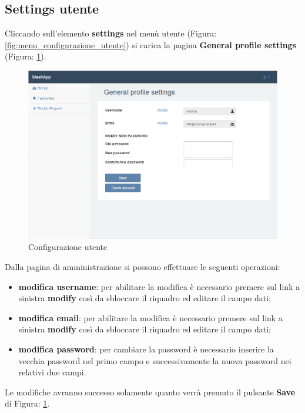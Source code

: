 	\subsection{Settings utente} %
	\label{sec:settings_utente}
		Cliccando sull'elemento \textbf{settings} nel menù utente (Figura: \ref{fig:menu_configurazione_utente}) si carica la pagina \textbf{General profile settings} (Figura: \ref{fig:configurazione_utente}).
		\begin{figure}[H]
			\centering
			\centerline{\includegraphics[width=14cm]{images/configurazione_utente.png}}
			\caption{Configurazione utente}
			\label{fig:configurazione_utente}
		\end{figure}
		Dalla pagina di amministrazione si possono effettuare le seguenti operazioni:
		\begin{itemize}
			\item \textbf{modifica username}: per abilitare la modifica è necessario premere sul link a sinistra \textbf{modify} così da sbloccare il riquadro ed editare il campo dati;
			\item \textbf{modifica email}: per abilitare la modifica è necessario premere sul link a sinistra \textbf{modify} così da sbloccare il riquadro ed editare il campo dati;
			\item \textbf{modifica password}: per cambiare la password è necessario inserire la vecchia password nel primo campo e successivamente la nuova password nei relativi due campi.
		\end{itemize}
		Le modifiche avranno successo solamente quanto verrà premuto il pulsante \textbf{Save} di Figura: \ref{fig:configurazione_utente}.


